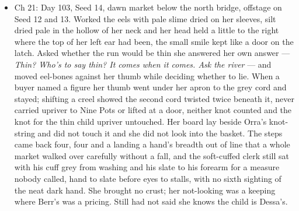 \documentclass{design/chronicle}
\begin{document}
{\begin{itemize}[leftmargin=1.4em,itemsep=1pt,topsep=3pt,parsep=0pt]
\end{itemize}

\begin{itemize}[leftmargin=1.4em,itemsep=1pt,topsep=3pt,parsep=0pt]

\item Ch 21: Day 103, Seed 14, dawn market below the north bridge, offstage on Seed 12 and 13. Worked the eels with pale slime dried on her sleeves, silt dried pale in the hollow of her neck and her head held a little to the right where the top of her left ear had been, the small smile kept like a door on the latch. Asked whether the run would be thin she answered her own answer — \emph{Thin? Who’s to say thin? It comes when it comes. Ask the river} — and moved eel-bones against her thumb while deciding whether to lie. When a buyer named a figure her thumb went under her apron to the grey cord and stayed; shifting a creel showed the second cord twisted twice beneath it, never carried upriver to Nine Pots or lifted at a door, neither knot counted and the knot for the thin child upriver untouched. Her board lay beside Orra’s knot-string and did not touch it and she did not look into the basket. The steps came back four, four and a landing a hand’s breadth out of line that a whole market walked over carefully without a fall, and the soft-cuffed clerk still sat with his cuff grey from washing and his slate to his forearm for a measure nobody called, hand to slate before eyes to stalls, with no sixth sighting of the neat dark hand. She brought no crust; her not-looking was a keeping where Berr’s was a pricing. Still had not said she knows the child is Dessa’s.

\end{itemize}

\begin{itemize}[leftmargin=1.4em,itemsep=1pt,topsep=3pt,parsep=0pt]


\end{itemize}}
\end{document}
